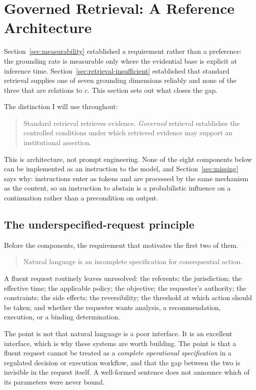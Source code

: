 \chapter{Governed Retrieval: A Reference Architecture}
\label{ch:governed-rag}
\label{sec:governed-rag}

Section~\ref{sec:measurability} established a requirement rather than a preference:
the grounding rate is measurable only where the evidential base is explicit at
inference time. Section~\ref{sec:retrieval-insufficient} established that standard
retrieval supplies one of seven grounding dimensions reliably and none of the three
that are relations to $c$. This section sets out what closes the gap.

The distinction I will use throughout:

\begin{quote}
Standard retrieval retrieves evidence. \emph{Governed} retrieval establishes the
controlled conditions under which retrieved evidence may support an institutional
assertion.
\end{quote}

This is architecture, not prompt engineering. None of the eight components below can
be implemented as an instruction to the model, and Section~\ref{sec:missing} says
why: instructions enter as tokens and are processed by the same mechanism as the
content, so an instruction to abstain is a probabilistic influence on a
continuation rather than a precondition on output.

\section{The underspecified-request principle}
\label{sec:holodeck}

Before the components, the requirement that motivates the first two of them.

\begin{quote}
Natural language is an incomplete specification for consequential action.
\end{quote}

A fluent request routinely leaves unresolved: the referents; the jurisdiction; the
effective time; the applicable policy; the objective; the requester's authority; the
constraints; the side effects; the reversibility; the threshold at which action
should be taken; and whether the requester wants analysis, a recommendation,
execution, or a binding determination.

The point is not that natural language is a poor interface. It is an excellent
interface, which is why these systems are worth building. The point is that a
fluent request cannot be treated as a \emph{complete operational specification} in a
regulated decision or execution workflow, and that the gap between the two is
invisible in the request itself. A well-formed sentence does not announce which of
its parameters were never bound.

